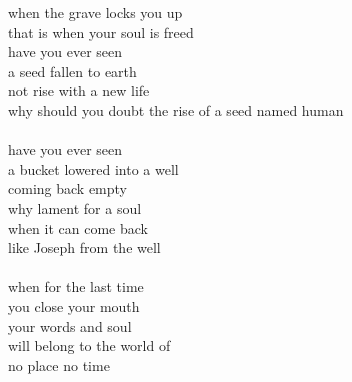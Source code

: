\begin{flushleft}
\begin{paracol}{3}
when the grave locks you up\\
that is when your soul is freed\\
\switchcolumn[2]
have you ever seen\\
a seed fallen to earth\\
not rise with a new life\\
why should you doubt the rise
of a seed named human\\ \-\ \\
have you ever seen\\
a bucket lowered into a well\\
coming back empty\\
why lament for a soul\\
when it can come back\\
like Joseph from the well\\ \-\ \\
when for the last time\\
you close your mouth\\
your words and soul\\
will belong to the world of\\
no place no time
\end{paracol}
\end{flushleft}
\vfill
\hspace{0pt}